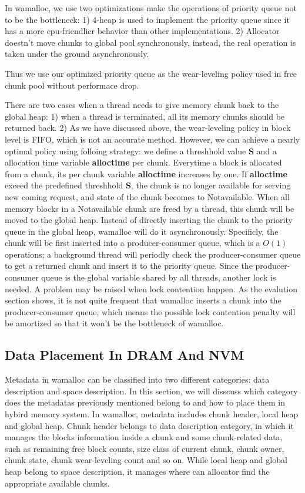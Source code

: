 \documentclass{vldb}
\begin{document}
In wamalloc, we use two optimizations make the operations of priority queue not to be the bottleneck:
1) 4-heap is used to implement the priority queue since it has a more cpu-friendlier behavior than other implementations.
2) Allocator doestn't move chunks to global pool synchronously, instead, the real operation is taken under the ground asynchronously.

Thus we use our optimized priority queue as the wear-leveling policy used in free chunk pool without performace drop.

There are two cases when a thread needs to give memory chunk back to the global heap: 
1) when a thread is terminated, all its memory chunks should be returned back.
2) As we have discussed above, the wear-leveling policy in block level is FIFO, which is not an accurate method.
However, we can achieve a nearly optimal policy using folloing strategy: 
we define a threshhold value \textbf{S} and a allocation time variable \textbf{alloctime} per chunk. 
Everytime a block is allocated from a chunk, its per chunk variable \textbf{alloctime} increases by one.
If \textbf{alloctime} exceed the predefined threshhold \textbf{S}, 
the chunk is no longer available for serving new coming request, and state of the chunk becomes to Notavailable.
When all memory blocks in a Notavailable chunk are freed by a thread, this chunk will be moved to the global heap.
Instead of directly inserting the chunk to the priority queue in the global heap, wamalloc will do it asynchronously.
Specificly, the chunk will be first inserted into a producer-consumer queue, which is a $O(1)$ operations;
a background thread will periodly check the producer-consumer queue to get a returned chunk and insert it to the priority queue.
Since the producer-consumer queue is the global variable shared by all threads, another lock is needed.
A problem may be raised when lock contention happen.
As the evalution section shows, it is not quite frequent that wamalloc inserts a chunk into the producer-consumer queue,
which means the possible lock contention penalty will be amortized so that it won't be the bottleneck of wamalloc.

\subsection{Data Placement In DRAM And NVM}

Metadata in wamalloc can be classified into two different categories: data description and space description.
In this section, we will disscuss which category does the metadatas previously mentioned belong to and how to place them in hybird memory system.
In wamalloc, metadata includes chunk header, local heap and global heap.
Chunk header belongs to data description category, in which it manages the blocks information inside a chunk and some chunk-related data, such as remaining free block counts, size class of current chunk, chunk owner, chunk state, chunk wear-leveling count and so on.
While local heap and global heap belong to space description, it manages where can allocator find the appropriate available chunks.
\end{document}
